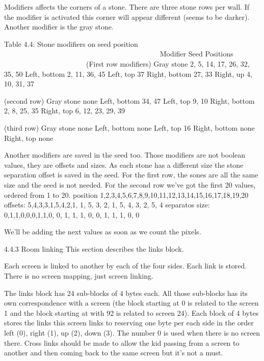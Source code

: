  Modifiers affects the corners of a stone. There are three stone rows per
 wall. If the modifier is activated this corner will appear different
 (seems to be darker). Another modifier is the gray stone.

                   Table 4.4: Stone modifiers on seed position
                   ~~~~~~~~~~~~~~~~~~~~~~~~~~~~~~~~~~~~~~~~~~~
  Modifier       Seed Positions
	~~~~~~~~       ~~~~ ~~~~~~~~~
     (First row modifiers)
  Gray stone     2, 5, 14, 17, 26, 32, 35, 50
  Left, bottom   2, 11, 36, 45
  Left, top      37
  Right, bottom  27, 33
  Right, up      4, 10, 31, 37

     (second row)
  Gray stone     none 
  Left, bottom   34, 47
  Left, top      9, 10
  Right, bottom  2, 8, 25, 35
  Right, top     6, 12, 23, 29, 39

     (third row)
  Gray stone     none 
  Left, bottom   none
  Left, top      16
  Right, bottom  none
  Right, top     none

 Another modifiers are saved in the seed too. Those modifiers are not
 boolean values, they are offsets and sizes. As each stone has a different
 size the stone separation offset is saved in the seed.
 For the first row, the sones are all the same size and the seed is not
 needed.
 For the second row we've got the first 20 values, ordered from 1 to 20. 
 position        1,2,3,4,5,6,7,8,9,10,11,12,13,14,15,16,17,18,19,20
 offsets:        5,4,3,3,1,5,4,2,1, 1, 5, 3, 2, 1, 5, 4, 3, 2, 5, 4
 separatos size: 0,1,1,0,0,0,1,1,0, 0, 1, 1, 1, 0, 0, 1, 1, 1, 0, 0

 We'll be adding the next values as soon as we count the pixels.

4.4.3 Room linking
 This section describes the links block.

 Each screen is linked to another by each of the four sides. Each link
 is stored. There is no screen mapping, just screen linking.

 The links block has 24 sub-blocks of 4 bytes each. All those sub-blocks
 has its own correspondence with a screen (the block starting at 0 is
 related to the screen 1 and the block starting at with 92 is related to
 screen 24).
 Each block of 4 bytes stores the links this screen links to reserving one
 byte per each side in the order left (0), right (1), up (2), down (3).
 The number 0 is used when there is no screen there.
 Cross links should be made to allow the kid passing from a screen to
 another and then coming back to the same screen but it's not a must.

